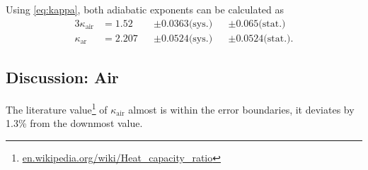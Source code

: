 Using \autoref{eq:kappa}, both adiabatic exponents can be calculated as
\begin{alignat*}{3}
	\kappa_\text{air}&=\num{1.52}&&\pm\num{0.0363}\text{(sys.)}&&\pm\num{0.065}\text{(stat.)} \\
	\kappa_\text{ar}&=\num{2.207}&&\pm\num{0.0524}\text{(sys.)}&&\pm\num{0.0524}\text{(stat.)}.
\end{alignat*}

\subsection{Discussion: Air}
The literature value\footnote{\url{en.wikipedia.org/wiki/Heat_capacity_ratio}} of $\kappa_\text{air}$ almost is within the error boundaries, it deviates by \num{1.3}\% from the downmost value.
